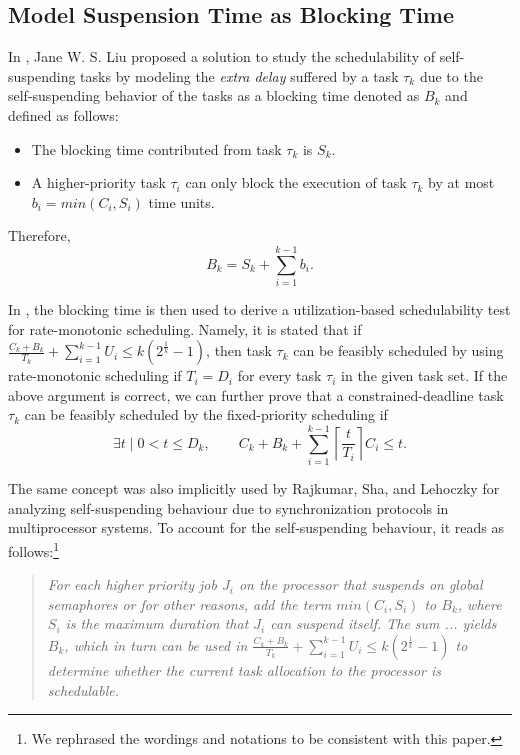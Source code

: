 \documentclass[10pt,conference]{IEEEtran}
\newcommand{\ceiling}[1]{\left\lceil{#1}\right\rceil}
\begin{document}
\subsection{Model Suspension Time as Blocking Time}

In \cite[Pages 164-165]{Liu:2000:RS:518501}, Jane W. S. Liu proposed a solution to study the schedulability of self-suspending tasks by modeling the \emph{extra delay} suffered by a task $\tau_k$ due to the self-suspending behavior of the tasks as a blocking time denoted as $B_k$ and defined as follows:
\begin{itemize}
\item The blocking time contributed from task $\tau_k$ is $S_k$.
\item A higher-priority task $\tau_i$ can only block the execution of task $\tau_k$ by at most $b_i=min(C_i, S_i)$ time units.
\end{itemize}
Therefore, 
\begin{equation}
\label{eq:Bk}
B_k = S_k + \sum_{i=1}^{k-1} b_i.
\end{equation}

In \cite{Liu:2000:RS:518501}, the blocking time is then used to derive a utilization-based schedulability test for rate-monotonic scheduling. Namely, it is stated that if $\frac{C_k+B_k}{T_k} + \sum_{i=1}^{k-1} U_i \leq k (2^{\frac{1}{k}}-1)$, then task $\tau_k$ can be feasibly scheduled by using rate-monotonic scheduling if $T_i=D_i$ for every task $\tau_i$ in the given task set. If the above argument is correct, we can further prove that a constrained-deadline task $\tau_k$ can be feasibly scheduled by the fixed-priority scheduling if
\begin{equation}
\label{eq:TDA-suspension}
\exists t \mid 0 < t \leq D_k, \qquad C_k + B_k + \sum_{i=1}^{k-1}\ceiling{\frac{t}{T_i}} C_i \leq t.
\end{equation}
  

The same concept was also implicitly used by Rajkumar, Sha, and Lehoczky \cite[Page 267]{DBLP:conf/rtss/RajkumarSL88} for analyzing self-suspending behaviour due to synchronization protocols in multiprocessor systems. To account for the self-suspending behaviour, it reads as follows:\footnote{We rephrased the wordings and notations to be consistent with this paper.}
\begin{quote}
\emph{For each higher priority job $J_i$ on the processor that suspends on global semaphores or for other reasons, add the term $min(C_i, S_i)$ to $B_k$, where $S_i$ is the maximum duration that $J_i$ can suspend itself. The sum ... yields $B_k$, which in turn can be used in 
$\frac{C_k+B_k}{T_k} + \sum_{i=1}^{k-1} U_i \leq k (2^{\frac{1}{k}}-1)$ to determine whether the current task allocation to the processor is schedulable.}
\end{quote}
  
\end{document}
